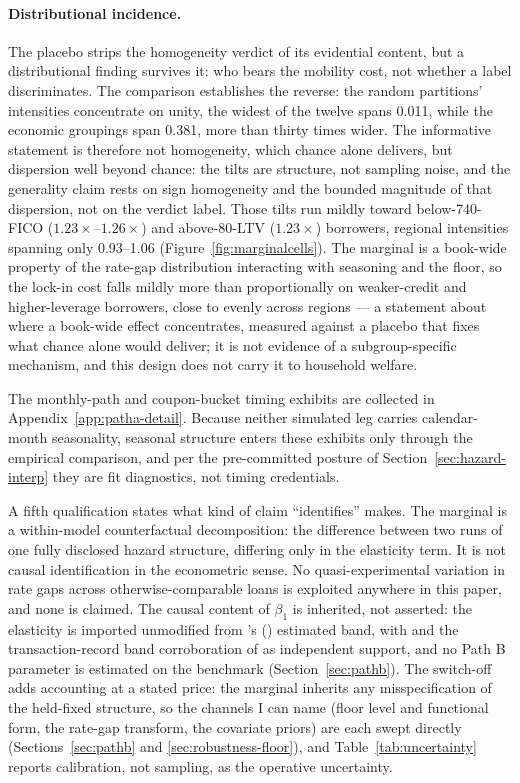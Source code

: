 \documentclass[12pt]{article}
\newcommand{\citepos}[1]{\citeauthor{#1}'s (\citeyear{#1})}
\begin{document}
\paragraph{Distributional incidence.} The placebo strips the homogeneity verdict of its evidential content, but a distributional finding survives it: who bears the mobility cost, not whether a label discriminates. The comparison establishes the reverse: the random partitions' intensities concentrate on unity, the widest of the twelve spans 0.011, while the economic groupings span 0.381, more than thirty times wider. The informative statement is therefore not homogeneity, which chance alone delivers, but dispersion well beyond chance: the tilts are structure, not sampling noise, and the generality claim rests on sign homogeneity and the bounded magnitude of that dispersion, not on the verdict label. Those tilts run mildly toward below-740-FICO ($1.23\times$--$1.26\times$) and above-80-LTV ($1.23\times$) borrowers, regional intensities spanning only 0.93--1.06 (Figure~\ref{fig:marginalcells}). The marginal is a book-wide property of the rate-gap distribution interacting with seasoning and the floor, so the lock-in cost falls mildly more than proportionally on weaker-credit and higher-leverage borrowers, close to evenly across regions --- a statement about where a book-wide effect concentrates, measured against a placebo that fixes what chance alone would deliver; it is not evidence of a subgroup-specific mechanism, and this design does not carry it to household welfare.

The monthly-path and coupon-bucket timing exhibits are collected in Appendix~\ref{app:patha-detail}. Because neither simulated leg carries calendar-month seasonality, seasonal structure enters these exhibits only through the empirical comparison, and per the pre-committed posture of Section~\ref{sec:hazard-interp} they are fit diagnostics, not timing credentials.

A fifth qualification states what kind of claim ``identifies'' makes. The marginal is a within-model counterfactual decomposition: the difference between two runs of one fully disclosed hazard structure, differing only in the elasticity term. It is not causal identification in the econometric sense. No quasi-experimental variation in rate gaps across otherwise-comparable loans is exploited anywhere in this paper, and none is claimed. The causal content of $\beta_1$ is inherited, not asserted: the elasticity is imported unmodified from \citepos{liebersohn2024} estimated band, with \citet{fonseca2024} and the transaction-record band corroboration of \citet{graybill2026} as independent support, and no Path B parameter is estimated on the benchmark (Section~\ref{sec:pathb}). The switch-off adds accounting at a stated price: the marginal inherits any misspecification of the held-fixed structure, so the channels I can name (floor level and functional form, the rate-gap transform, the covariate priors) are each swept directly (Sections~\ref{sec:pathb} and \ref{sec:robustness-floor}), and Table~\ref{tab:uncertainty} reports calibration, not sampling, as the operative uncertainty.
\end{document}
